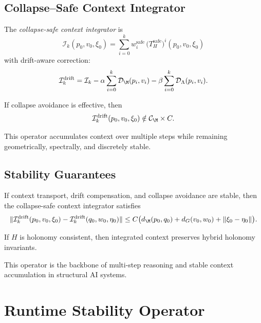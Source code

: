 \subsection{Collapse--Safe Context Integrator}

\begin{definition}
The \emph{collapse-safe context integrator} is
\[
\mathcal{I}_k(p_0,v_0,\xi_0)
= \sum_{i=0}^k w_i^\mathrm{safe}\,
\Big( T_H^\mathrm{safe} \Big)^i (p_0,v_0,\xi_0)
\]
with drift-aware correction:
\[
\mathcal{I}_k^\mathrm{drift}
= \mathcal{I}_k
- \alpha \sum_{i=0}^k \mathcal{D}_\M(p_i,v_i)
- \beta \sum_{i=0}^k \mathcal{D}_\Lambda(p_i,v_i).
\]
\end{definition}

\begin{lemma}
If collapse avoidance is effective, then
\[
\mathcal{I}_k^\mathrm{drift}(p_0,v_0,\xi_0)
\notin \mathcal{C}_\M \times C.
\]
\end{lemma}

\begin{remark}
This operator accumulates context over multiple steps while remaining
geometrically, spectrally, and discretely stable.
\end{remark}

\subsection{Stability Guarantees}

\begin{theorem}
If context transport, drift compensation, and collapse avoidance are
stable, then the collapse-safe context integrator satisfies
\[
\| \mathcal{I}_k^\mathrm{drift}(p_0,v_0,\xi_0)
 - \mathcal{I}_k^\mathrm{drift}(q_0,w_0,\eta_0) \|
\le C \big( d_\M(p_0,q_0) + d_G(v_0,w_0) + \|\xi_0 - \eta_0\| \big).
\]
\end{theorem}

\begin{lemma}
If $H$ is holonomy consistent, then integrated context preserves hybrid
holonomy invariants.
\end{lemma}

\begin{remark}
This operator is the backbone of multi-step reasoning and stable context
accumulation in structural AI systems.
\end{remark}

\section{Runtime Stability Operator}

